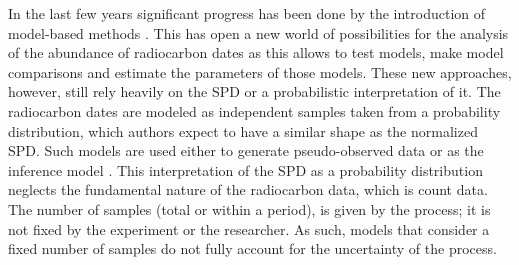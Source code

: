 \documentclass[a4paper]{article}
\begin{document}
In the last few years significant progress has been done by the introduction of model-based methods \parencite[reviewed by][]{Crema2022}. This has open a new world of possibilities for the analysis of the abundance of radiocarbon dates as this allows to test models, make model comparisons and estimate the parameters of those models. These new approaches, however, still rely heavily on the SPD or a probabilistic interpretation of it. The radiocarbon dates are modeled as independent samples taken from a probability distribution, which authors expect to have a similar shape as the normalized SPD. Such models are used either to generate pseudo-observed data or as the inference model \parencite{Porcic2020, Carleton2021b, Crema2021b, Timpson2020}. This interpretation of the SPD as a probability distribution neglects the fundamental nature of the radiocarbon data, which is count data. The number of samples (total or within a period), is given by the process; it is not fixed by the experiment or the researcher. As such, models that consider a fixed number of samples do not fully account for the uncertainty of the process.
\\
 

\end{document}
